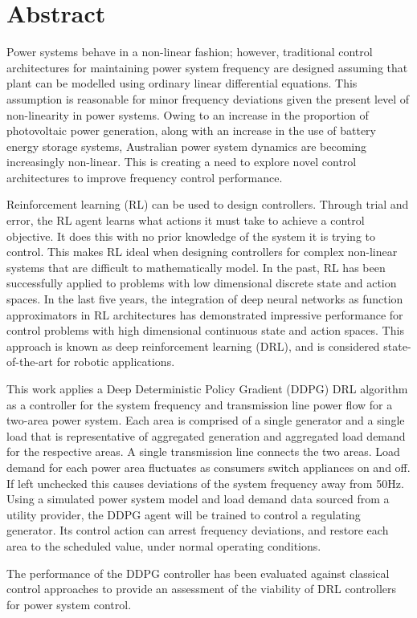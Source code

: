\chapter*{Abstract} %
Power systems behave in a non-linear fashion; however, traditional control architectures for maintaining power system frequency are designed assuming that plant can be modelled using ordinary linear differential equations. This assumption is reasonable for minor frequency deviations given the present level of non-linearity in power systems. Owing to an increase in the proportion of photovoltaic power generation, along with an increase in the use of battery energy storage systems, Australian power system dynamics are becoming increasingly non-linear. This is creating a need to explore novel control architectures to improve frequency control performance.

Reinforcement learning (RL) can be used to design controllers. Through trial and error, the RL agent learns what actions it must take to achieve a control objective. It does this with no prior knowledge of the system it is trying to control. This makes RL ideal when designing controllers for complex non-linear systems that are difficult to mathematically model. In the past, RL has been successfully applied to problems with low dimensional discrete state and action spaces. In the last five years, the integration of deep neural networks as function approximators in RL architectures has demonstrated impressive performance for control problems with high dimensional continuous state and action spaces. This approach is known as deep reinforcement learning (DRL), and is considered state-of-the-art for robotic applications.

This work applies a Deep Deterministic Policy Gradient (DDPG) DRL algorithm as a controller for the system frequency and transmission line power flow for a two-area power system. Each area is comprised of a single generator and a single load that is representative of aggregated generation and aggregated load demand for the respective areas. A single transmission line connects the two areas. Load demand for each power area fluctuates as consumers switch appliances on and off. If left unchecked this causes deviations of the system frequency away from 50$\si{\hertz}$. Using a simulated power system model and load demand data sourced from a utility provider, the DDPG agent will be trained to control a regulating generator. Its control action can arrest frequency deviations, and restore each area to the scheduled value, under normal operating conditions.

The performance of the DDPG controller has been evaluated against classical control approaches to provide an assessment of the viability of DRL controllers for power system control.